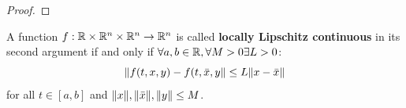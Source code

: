 \begin{lemma}
    \label{lemma-continuity}

\end{lemma}

\begin{proof}
\end{proof}

\begin{definition}
    \label{definition-lipschitz}

    A function $f:\mathbb{R}\times\mathbb{R}^n\times\mathbb{R}^n\rightarrow\mathbb{R}^n$ is called \textbf{locally Lipschitz continuous} in its second argument if and only if $\forall a,b\in\mathbb{R},\forall M>0 \exists L>0$:
    \begin{equation}
        \lVert f(t,x,y) - f(t,\bar{x},y\rVert \leq L\lVert x - \bar{x}\rVert
    \end{equation}
    for all $t\in [a,b]$ and $\lVert x\rVert,\lVert\bar{x}\rVert,\lVert y\rVert\leq M$.
\end{definition}

